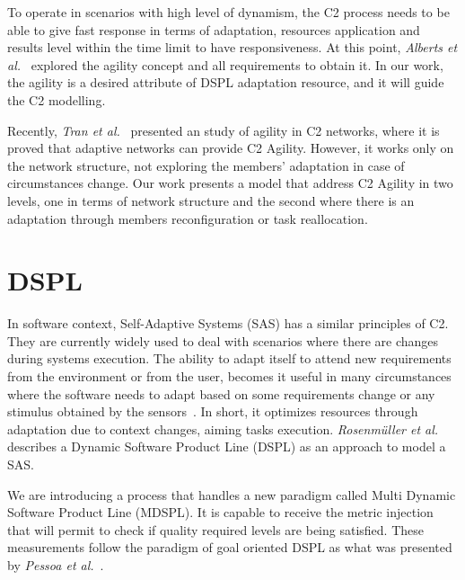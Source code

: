 To operate in scenarios with high level of dynamism, the C2 process needs to be able to give fast response in terms of adaptation, resources application and results level within the time limit to have responsiveness. At this point, \textit{Alberts et al.}~\cite{Alberts2011} explored the agility concept and all requirements to obtain it. In our work, the agility is a desired attribute of DSPL adaptation resource, and it will guide the C2 modelling. 

Recently, \textit{Tran et al.}~\cite{c2-02} presented an study of agility in C2 networks, where it is proved that adaptive networks can provide C2 Agility. However, it works only on the network structure, not exploring the members' adaptation in case of circumstances change. Our work presents a model that address C2 Agility in two levels, one in terms of network structure and the second where there is an adaptation through members reconfiguration or task reallocation.




\section{DSPL}

In software context, Self-Adaptive Systems (SAS) has a similar principles of C2. They are currently widely used to deal with scenarios where there are changes during systems execution. The ability to adapt itself to attend new requirements from the environment or from the user, becomes it useful in many circumstances where the software needs to adapt based on some requirements change or any stimulus obtained by the sensors~\cite{SAS04}. In short, it optimizes resources through adaptation due to context changes, aiming tasks execution. \textit{Rosenmüller et al.}~\cite{Rosenmuller2011} describes a Dynamic Software Product Line (DSPL) as an approach to model a SAS. 

We are introducing a process that handles a new paradigm called Multi Dynamic Software Product Line (MDSPL). It is capable to receive the metric injection that will permit to check if quality required levels are being satisfied. These measurements follow the paradigm of goal oriented DSPL as what was presented by \textit{Pessoa et al.}~\cite{Pessoa2017}.

